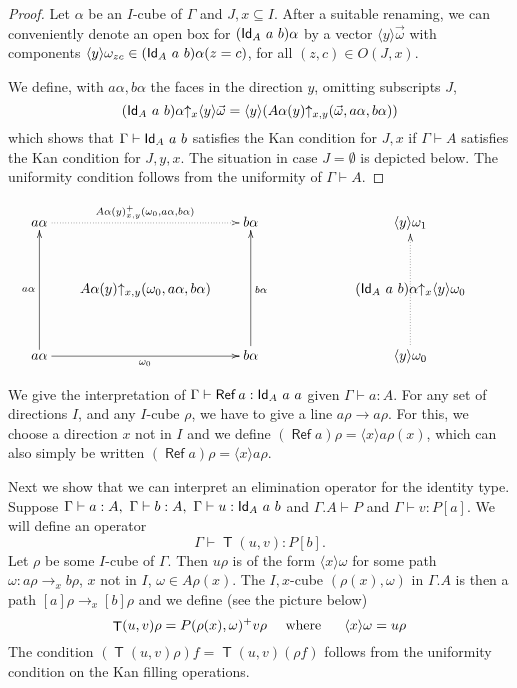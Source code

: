 \documentclass[10pt,a4paper]{article}
\DeclareMathOperator{\Ref}{\mathsf{Ref}}
\DeclareMathOperator{\Transp}{\mathsf{T}}
\newcommand{\Id}{{\sf Id}}
\newcommand{\es}{\emptyset}
\newcommand{\rupx}[1]{#1{\uparrow_{x}}}
\newcommand{\rupxy}[1]{#1{\uparrow_{x,y}}}
\newcommand{\bind}[2]{{\langle}#1{\rangle}#2}
\begin{document}
\begin{proof}
  Let $\alpha$ be an $I$-cube of $\Gamma$ and $J,x\subseteq I$. After
  a suitable renaming, we can conveniently denote an open box for
  $(\Id_A~a~b)\alpha$ by a vector $\bind{y}{\vec{\omega}}$ with
  components $\bind{y}{\omega_{zc}}\in(\Id_A~a~b)\alpha(z=c)$, for all
  $(z,c)\in O(J,x)$.

  We define, with $a\alpha,b\alpha$ the faces in the direction $y$,
  omitting subscripts $J$,
  $$
  \rupx{(\Id_A~a~b)\alpha}\bind{y}{\vec{\omega}} =
  \bind{y}{(\rupxy{A\alpha(y)} (\vec{\omega},a\alpha,b\alpha))}
  $$
  which shows that $\Gamma\vdash \Id_A~a~b$ satisfies the Kan
  condition for $J,x$ if $\Gamma\vdash A$ satisfies the Kan condition for
  $J,y,x$. The situation in case $J=\es$ is depicted below.  The
  uniformity condition follows from the uniformity of $\Gamma\vdash A$.
\end{proof}
\[
\xymatrix@R=1.1cm@C=.6cm{
a\alpha\ar@{.>}[rr]^{A\alpha(y)_{x,y}^+(\omega_0,a\alpha,b\alpha)}&      & b\alpha                                     &&&
\bind{y}{\omega_1}                                &          \\
                                      &\rupxy{A\alpha(y)}(\omega_0,a\alpha,b\alpha)&                          &&&
                                      \rupx{(\Id_A~a~b)\alpha} \bind{y}{\omega_0}&                           \\
a\alpha\ar[rr]_{\omega_0}\ar[uu]^{a\alpha}&      & b\alpha\ar[uu]_{b\alpha}                                     &&&
\bind{y}{\omega_0}\ar@{.>}[uu]     &                             \\
}
\]

We give the interpretation of $\Gamma\vdash \Ref a:\Id_A~a~a$ given
$\Gamma\vdash a:A$. For any set of directions $I$, and any $I$-cube
$\rho$, we have to give a line $a\rho\to a\rho$. For this, we choose a
direction $x$ not in $I$ and we define 
$(\Ref a)\rho = \bind{x}{a\rho(x)}$, 
which can also simply be written $(\Ref a)\rho = \bind{x}{a\rho}$.

Next we show that we can interpret an elimination operator for the
identity type.  Suppose $\Gamma\vdash a:A,~\Gamma\vdash
b:A,~\Gamma\vdash u:\Id_A~a~b$ and $\Gamma.A\vdash P$ and
$\Gamma\vdash v:P[a]$. We will define an operator
$$
\Gamma\vdash \Transp(u,v):P[b].
$$
Let $\rho$ be some $I$-cube of $\Gamma$. Then $u\rho$ is of the form
$\bind{x}{\omega}$ for some path $\omega:a\rho\to _x b\rho$, $x$ not
in $I$, $\omega\in A\rho(x)$.  The $I,x$-cube $(\rho (x),\omega)$ in
$\Gamma.A$ is then a path $[a]\rho\to _x [b]\rho$ and we define (see
the picture below)
$$
\Transp(u,v)\rho = P(\rho (x),\omega)^+ v\rho~~~~{\rm
  where~~~~~}\bind{x}{\omega} = u\rho
$$
The condition $(\Transp(u,v)\rho)f = \Transp(u,v)(\rho f)$ follows
from the uniformity condition on the Kan filling operations.
\end{document}
